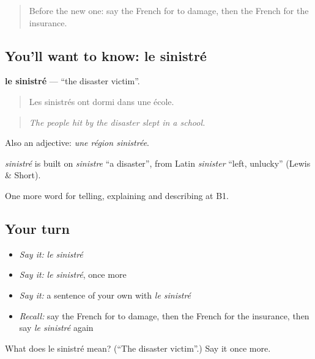 \begin{quote}
Before the new one: say the French for to damage, then the French for the insurance.
\end{quote}

\subsection*{You'll want to know: le sinistré}
\textbf{le sinistré} — \textquotedblleft{}the disaster victim\textquotedblright{}.

\begin{quote}
Les sinistrés ont dormi dans une école.
\end{quote}

\begin{quote}
\emph{The people hit by the disaster slept in a school.}
\end{quote}

Also an adjective: \emph{une région sinistrée}.

\begin{cousinweb}
\emph{sinistré} is built on \emph{sinistre} \textquotedblleft{}a disaster\textquotedblright{}, from Latin \emph{sinister} \textquotedblleft{}left, unlucky\textquotedblright{} (Lewis \& Short).
\end{cousinweb}

\begin{grammarlens}[title={What you've built}]
One more word for telling, explaining and describing at B1.
\end{grammarlens}

\subsection*{Your turn}
\begin{itemize}
\raggedright
  \item \emph{Say it:} \emph{le sinistré}
  \item \emph{Say it:} \emph{le sinistré}, once more
  \item \emph{Say it:} a sentence of your own with \emph{le sinistré}
  \item \emph{Recall:} say the French for to damage, then the French for the insurance, then say \emph{le sinistré} again
\end{itemize}

\begin{tcolorbox}[breakable,colback=teal!4,colframe=teal!35!black,title={Before you move on}]
What does le sinistré mean? (\textquotedblleft{}The disaster victim\textquotedblright{}.) Say it once more.
\end{tcolorbox}
